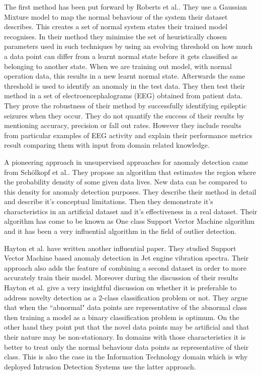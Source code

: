 \documentclass[reqno,openany,12pt]{amsbook}
\begin{document}
The first method has been put forward by Roberts et al.\cite{out1}. 
They use a Gaussian Mixture model to map the normal behaviour of the system their dataset describes. This creates a set of normal system states their trained model recognises. In their method they minimise the set of heuristically chosen parameters used in such techniques by using an evolving threshold on how much a data point can differ from a learnt normal state before it gets classified as belonging to another state. When we are training out model, with normal operation data, this results in a new learnt normal state. Afterwards the same threshold is used to identify an anomaly in the test data. They then test their method in a set of electroencephalograms (EEG) obtained from patient data. They prove the robustness of their method by successfully identifying epileptic seizures 
when they occur. They do not quantify the success of their results by mentioning accuracy, precision or fall out rates. However they include results from particular examples of EEG activity and explain their performance metrics result comparing them with input from domain related knowledge.


A pioneering approach in unsupervised approaches for anomaly detection came from Schölkopf et al.\cite{out4}. They propose an algorithm that estimates the region where the probability density of some given data lives. New data can be compared to this density for anomaly detection purposes. They describe their method in detail and describe it's conceptual limitations. Then they demonstrate it's characteristics in an artificial dataset and it's effectiveness in a real dataset. Their algorithm has come to be known as One class Support Vector Machine algorithm and it has been a very influential algorithm in the field of outlier detection.


Hayton et al.\cite{out3} have written another influential paper. They studied Support Vector Machine based anomaly detection in Jet engine vibration spectra. Their approach also adds the feature of combining a second dataset in order to more accurately train their model. Moreover during the discussion of their results Hayton et al. give a very insightful discussion
on whether it is preferable to address novelty detection as a 2-class classification problem or not. They argue that when the ``abnormal" data points are representative of the abnormal class then training a model as a binary classification problem is optimum. On the other hand they point put that the novel data points may be artificial and that their nature may be non-stationary. In domains with those characteristics it is better to treat only the normal behaviour data points as representative of their class. This is also the case in the Information Technology domain which is why deployed Intrusion Detection Systems use the latter approach.
\end{document}
